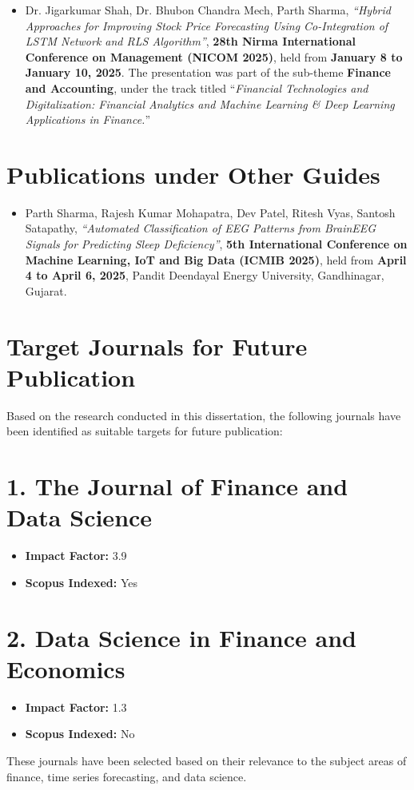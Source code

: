\begin{itemize}
    \item Dr. Jigarkumar Shah, Dr. Bhubon Chandra Mech, Parth Sharma, \textit{“Hybrid Approaches for Improving Stock Price Forecasting Using Co-Integration of LSTM Network and RLS Algorithm”}, \textbf{28th Nirma International Conference on Management (NICOM 2025)}, held from \textbf{January 8 to January 10, 2025}. The presentation was part of the sub-theme \textbf{Finance and Accounting}, under the track titled “\textit{Financial Technologies and Digitalization: Financial Analytics and Machine Learning \& Deep Learning Applications in Finance.}”
\end{itemize}

\section*{Publications under Other Guides}

\begin{itemize}
    \item Parth Sharma, Rajesh Kumar Mohapatra, Dev Patel, Ritesh Vyas, Santosh Satapathy, \textit{“Automated Classification of EEG Patterns from BrainEEG Signals for Predicting Sleep Deficiency”}, \textbf{5th International Conference on Machine Learning, IoT and Big Data (ICMIB 2025)}, held from \textbf{April 4 to April 6, 2025}, Pandit Deendayal Energy University, Gandhinagar, Gujarat.
\end{itemize}

\section*{Target Journals for Future Publication}

Based on the research conducted in this dissertation, the following journals have been identified as suitable targets for future publication:

\section*{1. The Journal of Finance and Data Science}
\begin{itemize}
    \item \textbf{Impact Factor:} 3.9
    \item \textbf{Scopus Indexed:} Yes
\end{itemize}

\section*{2. Data Science in Finance and Economics}
\begin{itemize}
    \item \textbf{Impact Factor:} 1.3
    \item \textbf{Scopus Indexed:} No
\end{itemize}

These journals have been selected based on their relevance to the subject areas of finance, time series forecasting, and data science.